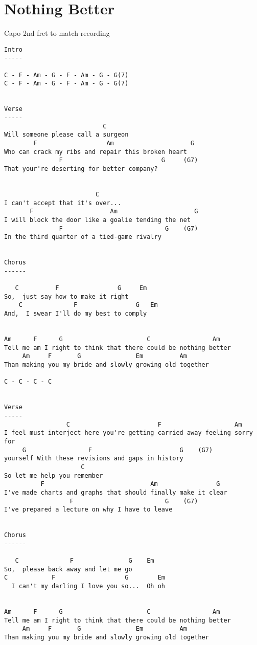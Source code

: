 \documentclass[leqno]{memoir}
\begin{document}
\chapter{Nothing Better}
Capo 2nd fret to match recording
\begin{verbatim}
Intro
-----

C - F - Am - G - F - Am - G - G(7)
C - F - Am - G - F - Am - G - G(7)


Verse
-----
                           C
Will someone please call a surgeon
        F                   Am                     G
Who can crack my ribs and repair this broken heart
               F                           G     (G7)
That your're deserting for better company?


                         C
I can't accept that it's over...
       F                     Am                     G
I will block the door like a goalie tending the net
               F                            G    (G7)
In the third quarter of a tied-game rivalry


Chorus
------

   C          F                G     Em
So,  just say how to make it right
    C              F                G   Em
And,  I swear I'll do my best to comply


Am      F      G                       C                 Am
Tell me am I right to think that there could be nothing better
     Am     F       G               Em          Am
Than making you my bride and slowly growing old together

C - C - C - C


Verse
-----
                 C                        F                    Am       
I feel must interject here you're getting carried away feeling sorry for
     G                 F                        G    (G7)
yourself With these revisions and gaps in history
                     C
So let me help you remember
          F                             Am                G
I've made charts and graphs that should finally make it clear
                  F                         G    (G7)
I've prepared a lecture on why I have to leave


Chorus
------

   C              F               G    Em
So,  please back away and let me go
C            F                   G        Em
  I can't my darling I love you so...  Oh oh


Am      F      G                       C                 Am
Tell me am I right to think that there could be nothing better
     Am     F       G               Em          Am
Than making you my bride and slowly growing old together


\end{verbatim}
\end{document}
